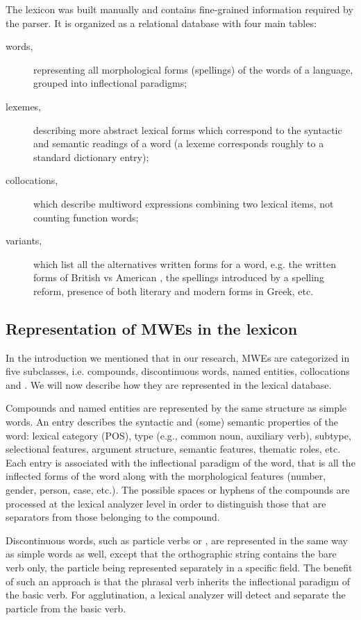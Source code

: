 \documentclass[output=paper]{langsci/langscibook}
\begin{document}
The lexicon was built manually and contains fine-grained information required by the parser. It is organized as a relational database with four main tables:

\begin{description}
\item[words,] representing all morphological forms (spellings) of the words of a language, grouped into inflectional paradigms; 
\item[lexemes,] describing more abstract lexical forms which correspond to the syntactic and semantic readings of a word (a lexeme corresponds roughly to a standard dictionary entry); 
\item[collocations,] which describe multiword expressions combining two lexical items, not counting function words;
\item[variants,] which list all the alternatives written forms for a word, e.g. the written forms of British  vs American , the spellings introduced by a spelling reform, presence of both literary and modern forms in Greek, etc.
\end{description}

\subsection{Representation of MWEs in the lexicon}

In the introduction we mentioned that in our research, MWEs are categorized in five subclasses, i.e. compounds, discontinuous words, named entities, collocations and .
We will now describe how they are represented in the lexical database.

Compounds and named entities are represented by the same structure as simple words. An entry describes the syntactic and (some) semantic properties of the word: lexical category (POS),
type (e.g., common noun, auxiliary verb), subtype, selectional features, argument structure, semantic features, thematic roles, etc. Each entry is associated with the inflectional paradigm of the word, 
that is all the inflected forms of the word along with the morphological features (number, gender, person, case, etc.). The possible spaces or hyphens of the compounds are processed 
at the lexical analyzer level in order to distinguish those that are separators from those belonging to the compound.

Discontinuous words, such as particle verbs or , are represented in the same way as simple words as well, except that the orthographic string contains the bare verb only, 
the particle being represented separately in a specific field. The benefit of such an approach is that the phrasal verb inherits the inflectional paradigm of the basic verb. For agglutination,
a lexical analyzer will detect and separate the particle from the basic verb.
\end{document}
